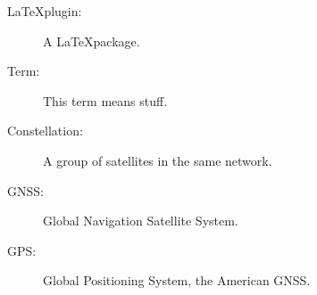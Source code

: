 

\label{fr:glossary}

\begin{description}

    \item[\LaTeX plugin:]\label{gloss:plugin} A \LaTeX package.
    \item[Term:]\label{gloss:term} This term means stuff.
	\item[Constellation:] A group of satellites in the same network.
	\item[GNSS:] Global Navigation Satellite System.
	\item[GPS:] Global Positioning System, the American GNSS.
\end{description}
